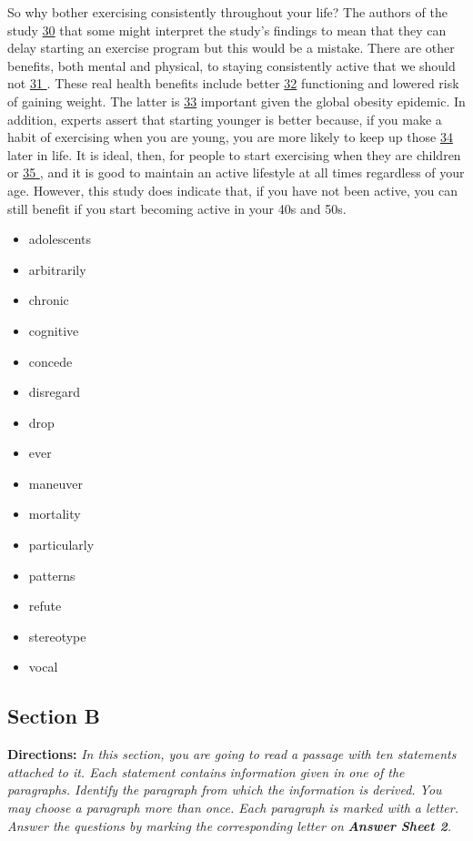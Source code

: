 \documentclass[UTF8,11pt]{ctexart}
\begin{document}
So why bother exercising consistently throughout your life? The authors of the study \uline{30} that some might interpret the study’s findings to mean that they can delay starting an exercise program but this would be a mistake. There are other benefits, both mental and physical, to staying consistently active that we should not \uline{31 }. These real health benefits include better \uline{32} functioning and lowered risk of gaining weight. The latter is \uline{33} important given the global obesity epidemic. In addition, experts assert that starting younger is better because, if you make a habit of exercising when you are young, you are more likely to keep up those \uline{34} later in life. It is ideal, then, for people to start exercising when they are children or \uline{35 }, and it is good to maintain an active lifestyle at all times regardless of your age. However, this study does indicate that, if you have not been active, you can still benefit if you start becoming active in your 40s and 50s.


\begin{itemize}[leftmargin=2em,itemsep=.2em,topsep=.4em]\item[A.] adolescents
\item[B.] arbitrarily
\item[C.] chronic
\item[D.] cognitive
\item[E.] concede
\item[F.] disregard
\item[G.] drop
\item[H.] ever
\item[I.] maneuver
\item[J.] mortality
\item[K.] particularly
\item[L.] patterns
\item[M.] refute
\item[N.] stereotype
\item[O.] vocal
\end{itemize}

\subsection*{\textbf{Section B}}


\textbf{Directions:} \textit{In this section, you are going to read a passage with ten statements attached to it. Each statement contains} \textit{information given in one of the paragraphs. Identify the paragraph from which the information is derived. You may} \textit{choose a paragraph more than once. Each paragraph is marked with a letter. Answer the questions by marking the} \textit{corresponding letter on }\textbf{\textit{Answer Sheet 2}}\textit{.}
\end{document}
